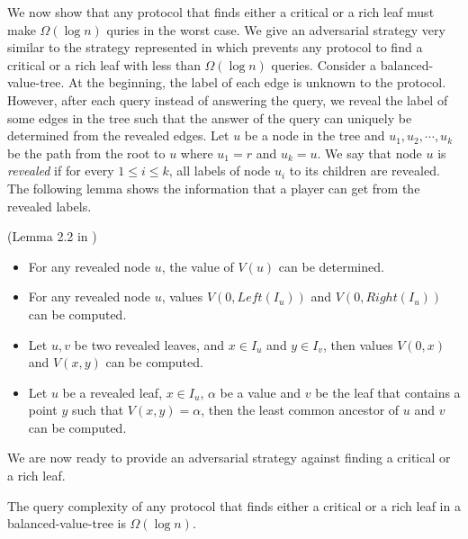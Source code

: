 We now show that any protocol that finds either a critical or a rich leaf must make $\Omega( \log n)$ quries in the worst case. We give an adversarial strategy very similar to the strategy represented in \cite{edmonds2006cake} which prevents any protocol to find a critical or a rich leaf with less than $\Omega( \log n)$ queries. Consider a balanced-value-tree. At the beginning, the label of each edge is unknown to the protocol. However, after each query instead of answering the query, we reveal the label of some edges in the tree such that the answer of the query can uniquely be determined from the revealed edges. Let $u$ be a node in the tree and $u_1, u_2, \cdots, u_k$ be the path from the root to $u$ where $u_1 = r$ and $u_k = u$. We say that node $u$ is \textit{revealed} if for every $1 \le i \le k$, all labels of node $u_i$ to its children are revealed. The following lemma shows the information that a player can get from the revealed labels.  
\begin{lemma} 
(Lemma 2.2 in \cite{edmonds2006cake})
\label{information}
\begin{itemize}
\item For any revealed node $u$, the value of $V(u)$ can be determined.
\item For any revealed node $u$, values $V(0,Left(I_u))$ and $V(0,Right(I_u))$ can be computed.
\item Let $u,v$ be two revealed leaves, and $x \in I_u$ and $y \in I_v$, then values $V(0,x)$ and $V(x,y)$ can be computed.
\item Let $u$ be a revealed leaf, $x \in I_u$, $\alpha$ be a value and $v$ be the leaf that contains a point $y$ such that $V(x,y)= \alpha$, then the least common ancestor of $u$ and $v$ can be computed. 
\end{itemize}
\end{lemma}
We are now ready to provide an adversarial strategy against finding a critical or a rich leaf.
\begin{lemma}
\label{strategy}
The query complexity of any protocol that finds either a critical or a rich leaf in a balanced-value-tree is $\Omega( \log n)$.
\end{lemma}
